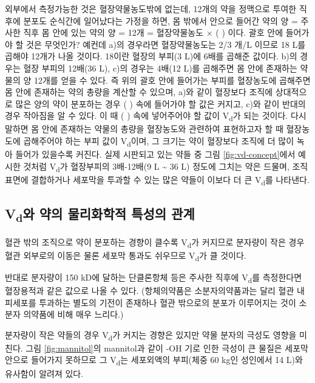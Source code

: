 \documentclass[
  11pt,
  krantz2, a4paper, twoside]{krantz}
\theoremstyle{definition}
\theoremstyle{definition}
\theoremstyle{definition}
\theoremstyle{definition}
\theoremstyle{remark}
\begin{document}
외부에서 측정가능한 것은 혈장약물농도밖에 없는데, 12개의 약을
정맥으로 투여한 직후에 분포도 순식간에 일어났다는 가정을 하면, 몸 밖에서
안으로 들어간 약의 양 = 주사한 직후 몸 안에 있는 약의 양 = 12개 =
혈장약물농도 × ( ) 이다. 괄호 안에 들어가야 할 것은 무엇인가? 예컨데
a)의 경우라면 혈장약물농도는 2/3 개/L 이므로 18 L를 곱해야 12개가 나올
것이다. 18이란 혈장의 부피(3 L)에 6배를 곱해준 값이다. b)의 경우는 혈장
부피의 12배(36 L), c)의 경우는 4배(12 L)를 곱해주면 몸 안에 존재하는
약물의 양 12개를 얻을 수 있다. 즉 위의 괄호 안에 들어가는 부피를
혈장농도에 곱해주면 몸 안에 존재하는 약의 총량을 계산할 수 있으며, a)와
같이 혈장보다 조직에 상대적으로 많은 양의 약이 분포하는 경우 ( ) 속에
들어가야 할 값은 커지고, c)와 같이 반대의 경우 작아짐을 알 수 있다. 이
때 ( ) 속에 넣어주어야 할 값이 V\textsubscript{d}가 되는 것이다. 다시 말하면 몸 안에
존재하는 약물의 총량을 혈장농도와 관련하여 표현하고자 할 때 혈장농도에
곱해주어야 하는 부피 값이 V\textsubscript{d}이며, 그 크기는 약이 혈장보다 조직에 더
많이 녹아 들어가 있을수록 커진다. 실제 시판되고 있는 약들 중 그림 \ref{fig:vd-concept}에서 예시한 것처럼 V\textsubscript{d}가 혈장부피의 3배-12배(9 L \textasciitilde{} 36 L) 정도에
그치는 약은 드물며, 조직 표면에 결합하거나 세포막을 투과할 수 있는
많은 약들이 이보다 더 큰 V\textsubscript{d}를 나타낸다.

\hypertarget{vduxc640-uxc57duxc758-uxbb3cuxb9acuxd654uxd559uxc801-uxd2b9uxc131uxc758-uxad00uxacc4}{%
\subsection{\texorpdfstring{V\textsubscript{d}와 약의 물리화학적 특성의 관계}{Vd와 약의 물리화학적 특성의 관계}}\label{vduxc640-uxc57duxc758-uxbb3cuxb9acuxd654uxd559uxc801-uxd2b9uxc131uxc758-uxad00uxacc4}}

혈관 밖의 조직으로 약이 분포하는 경향이 클수록 V\textsubscript{d}가 커지므로 분자량이
작은 경우 혈관 외부로의 이동은 물론 세포막 통과도 쉬우므로 V\textsubscript{d}가 클
것이다.

반대로 분자량이 150 kD에 달하는 단클론항체 등은 주사한 직후에 V\textsubscript{d}를
측정한다면 혈장용적과 같은 값으로 나올 수 있다. (항체의약품은
소분자의약품과는 달리 혈관 내피세포를 투과하는 별도의 기전이 존재하나
혈관 밖으로의 분포가 이루어지는 것이 소분자 의약품에 비해 매우 느리다.)

분자량이 작은 약들의 경우 V\textsubscript{d}가 커지는 경향은 있지만 약물 분자의 극성도
영향을 미친다. 그림 \ref{fig:mannitol}의 mannitol과 같이 -OH 기로 인한 극성이 큰 물질은 
세포막 안으로 들어가지 못하므로 그 V\textsubscript{d}는 세포외액의 부피(체중 60 kg인
성인에서 14 L)와 유사함이 알려져 있다.
\end{document}
